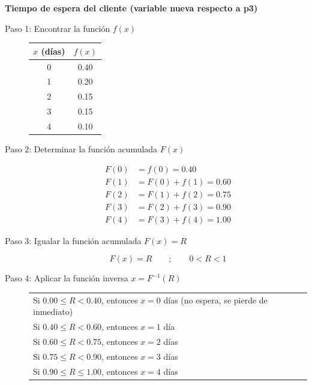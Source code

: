 \documentclass[12pt, a4paper]{article}
\begin{document}
\textbf{Tiempo de espera del cliente (variable nueva respecto a p3)}

\begin{description}
    \item[Paso 1: Encontrar la función $f(x)$]

    \begin{center}
    \begin{tabular}{cc}
    \toprule
    $x$ (días) & $f(x)$ \\
    \midrule
    0 & 0.40 \\ 1 & 0.20 \\ 2 & 0.15 \\ 3 & 0.15 \\ 4 & 0.10 \\
    \bottomrule
    \end{tabular}
    \end{center}

    \item[Paso 2: Determinar la función acumulada $F(x)$]

    \begin{align*}
    F(0) &= f(0) = 0.40 \\
    F(1) &= F(0)+f(1) = 0.60 \\
    F(2) &= F(1)+f(2) = 0.75 \\
    F(3) &= F(2)+f(3) = 0.90 \\
    F(4) &= F(3)+f(4) = 1.00
    \end{align*}

    \item[Paso 3: Igualar la función acumulada $F(x) = R$]

    $$ F(x)=R \qquad ; \qquad 0 < R < 1 $$

    \item[Paso 4: Aplicar la función inversa $x=F^{-1}(R)$]

    \begin{center}
    \begin{tabular}{l}
    Si $0.00 \leq R < 0.40$, entonces $x=0$ días (no espera, se pierde de inmediato) \\
    Si $0.40 \leq R < 0.60$, entonces $x=1$ día \\
    Si $0.60 \leq R < 0.75$, entonces $x=2$ días \\
    Si $0.75 \leq R < 0.90$, entonces $x=3$ días \\
    Si $0.90 \leq R \leq 1.00$, entonces $x=4$ días \\
    \end{tabular}
    \end{center}


\end{description}
\end{document}
